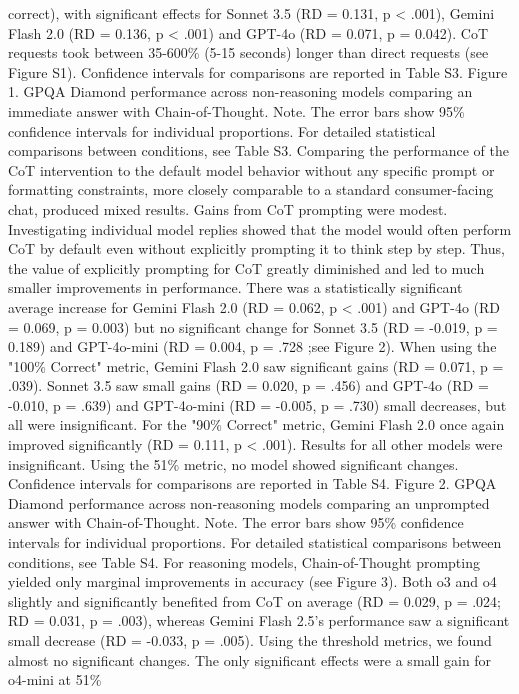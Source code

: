 correct), with significant effects for Sonnet 3.5 (RD = 0.131, p < .001), Gemini Flash 2.0 (RD =
0.136, p < .001) and GPT-4o (RD = 0.071, p = 0.042). CoT requests took between 35-600\%
(5-15 seconds) longer than direct requests (see Figure S1). Confidence intervals for
comparisons are reported in Table S3.
Figure 1. GPQA Diamond performance across non-reasoning models comparing an immediate
answer with Chain-of-Thought.
Note. The error bars show 95\% confidence intervals for individual proportions. For detailed
statistical comparisons between conditions, see Table S3.
Comparing the performance of the CoT intervention to the default model behavior without any
specific prompt or formatting constraints, more closely comparable to a standard
consumer-facing chat, produced mixed results. Gains from CoT prompting were modest.
Investigating individual model replies showed that the model would often perform CoT by default
even without explicitly prompting it to think step by step. Thus, the value of explicitly prompting
for CoT greatly diminished and led to much smaller improvements in performance. There was a
statistically significant average increase for Gemini Flash 2.0 (RD = 0.062, p < .001) and
GPT-4o (RD = 0.069, p = 0.003) but no significant change for Sonnet 3.5 (RD = -0.019, p =
0.189) and GPT-4o-mini (RD = 0.004, p = .728 ;see Figure 2).
When using the "100\% Correct" metric, Gemini Flash 2.0 saw significant gains (RD = 0.071, p =
.039). Sonnet 3.5 saw small gains (RD = 0.020, p = .456) and GPT-4o (RD = -0.010, p = .639)
and GPT-4o-mini (RD = -0.005, p = .730) small decreases, but all were insignificant. For the
"90\% Correct" metric, Gemini Flash 2.0 once again improved significantly (RD = 0.111, p <
.001). Results for all other models were insignificant. Using the 51\% metric, no model showed
significant changes. Confidence intervals for comparisons are reported in Table S4.
Figure 2. GPQA Diamond performance across non-reasoning models comparing an
unprompted answer with Chain-of-Thought.
Note. The error bars show 95\% confidence intervals for individual proportions. For detailed
statistical comparisons between conditions, see Table S4.
For reasoning models, Chain-of-Thought prompting yielded only marginal improvements in
accuracy (see Figure 3). Both o3 and o4 slightly and significantly benefited from CoT on
average (RD = 0.029, p = .024; RD = 0.031, p = .003), whereas Gemini Flash 2.5’s performance
saw a significant small decrease (RD = -0.033, p = .005). Using the threshold metrics, we found
almost no significant changes. The only significant effects were a small gain for o4-mini at 51\%
